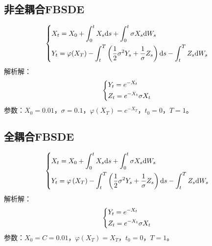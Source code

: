 	\subsection{非全耦合FBSDE}
			\begin{equation*}
			\centering
				\left\{\begin{lgathered}
				{{X_t} = {X_0} + \int_0^t {{X_s}\mathrm{d}s}  + \int_0^t {\sigma {X_s}\mathrm{d}{W_s}} }\\
				{{Y_t} = \varphi ( {{X_T}} ) - \int_t^T {\left( {\frac{1}{2}{\sigma ^2}{Y_s} + \frac{1}{\sigma }{Z_s}} \right)\mathrm{d}s}  - \int_t^T {{Z_s}\mathrm{d}{W_s}} }
				\end{lgathered} \right.
			\end{equation*}
	解析解：
		\begin{equation*}
			\centering
				\left\{\begin{lgathered}
			{{Y_t} = {e^{ - {X_t}}}}\\
			{{Z_t} = {e^{ - {X_t}}}\sigma {X_t}}
				\end{lgathered} \right.
		\end{equation*}
	参数：$X_0=0.01$，$\sigma=0.1$，$\varphi(X_T)=e^{-{X_T}}$，$t_0=0$，$T=1$。
	\subsection{全耦合FBSDE}
			\begin{equation*}
			\centering
				\left\{\begin{lgathered}
				{{X_t} = {X_0} + \int_0^t {{X_s}\mathrm{d}s}  + \int_0^t {\sigma {X_s}\mathrm{d}{W_s}} }\\
				{{Y_t} = \varphi \left( {{X_T}} \right) - \int_t^T {\left( {\frac{1}{2}{\sigma ^2}{Y_s} + \frac{1}{\sigma }{Z_s}} \right)\mathrm{d}s}  - \int_t^T {{Z_s}\mathrm{d}{W_s}} }
			\end{lgathered} \right.
			\end{equation*}
	解析解：
		\begin{equation*}
		\centering
			\left\{\begin{lgathered}
			{{Y_t} = {e^{ - {X_t}}}}\\
			{{Z_t} = {e^{ - {X_t}}}\sigma {X_t}}
			\end{lgathered} \right.
		\end{equation*}
	参数：$X_0=C=0.01$，$\varphi(X_T)={X_T}$，$t_0=0$，$T=1$。
